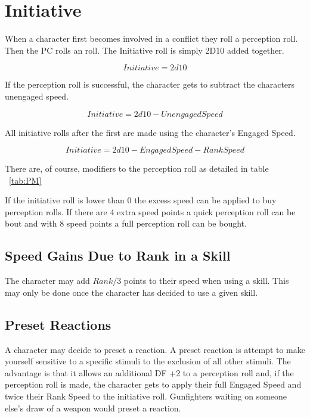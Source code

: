 


\section{Initiative}

When a character first becomes involved in a conflict they
roll a perception roll. Then the PC rolls an  roll. The 
Initiative roll is simply 2D10 added together.

\[{Initiative} = 2d10\]

If the perception roll is successful, the character gets to subtract
the characters unengaged speed.

\[{Initiative} = 2d10 - {Unengaged Speed}\]

All initiative rolls after the first are made using the character's Engaged Speed.

\[{Initiative} = 2d10 - {Engaged Speed} - {Rank Speed}\] 

There are, of course, modifiers to the perception roll as detailed in table 
~\ref{tab:PM}

If the initiative roll is lower than 0 the excess speed can be applied to 
buy perception rolls. If there are 4 extra speed points a quick perception roll
can be bout and with 8 speed points a full perception roll can be bought.

\subsection{Speed Gains Due to Rank in a Skill}

The character may add \( Rank/3 \) points to their speed when using a
skill. This may only be done once the character has decided to use a
given skill. 

\subsection{Preset Reactions}

A character may decide to preset a reaction. A preset reaction is 
attempt to make yourself sensitive to a specific stimuli to the exclusion
of all other stimuli. The advantage is that it allows an additional DF +2 
to a perception roll and, if the perception roll is made, the character gets
to apply their full Engaged Speed and twice their Rank Speed to the 
initiative roll. Gunfighters waiting on someone else's 
draw of a weapon would preset a reaction. 

